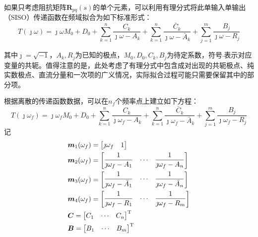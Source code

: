 如果只考虑阻抗矩阵$\boldsymbol{R}_{pq}(s)$的单个元素，可以利用有理分式将此单输入单输出（SISO）传递函数在频域拟合为如下标准形式\cite{Gustavsen:1999, Zeng:2006}：
\begin{equation}
	\label{eq:Standard-SISO-Freq}
	T(\jmath\omega)=\jmath\omega M_0+ D_0+ \sum_{k=1}^{n}\frac{C_k}{\jmath\omega-A_k}+ \sum_{k=1}^{n}\frac{\bar{C}_k}{\jmath\omega- \bar{A}_k}+ \sum_{j=1}^{m} \frac{B_j}{\jmath\omega -R_j}
\end{equation}

其中$\jmath=\sqrt{-1}$，$A_k, R_j$为已知的极点，$M_0, D_0, C_k, B_j$为待定系数，符号$\bar{}$表示对应变量的共轭。值得注意的是，此处考虑了有理分式中包含成对出现的共轭极点、纯实数极点、直流分量和一次项的广义情况，实际拟合过程可能只需要保留其中的部分项。

根据离散的传递函数数据，可以在$n_f$个频率点上建立如下方程：
\begin{equation}
	\label{eq:Discrete-Standard-Transfer}
	T(\jmath\omega_f)=\jmath\omega_f M_0+ D_0+ \sum_{k=1}^{n}\frac{C_k}{\jmath\omega_f-A_k}+ \sum_{k=1}^{n}\frac{\bar{C}_k}{\jmath\omega_f- \bar{A}_k}+ \sum_{j=1}^{m} \frac{B_j}{\jmath\omega_f -R_j}
\end{equation}
记
\begin{align}
	& \boldsymbol{m}_1(\omega_f)=\left[ \begin{matrix}
	   \jmath\omega_f & 1
	\end{matrix} \right] \nonumber\\
	& \boldsymbol{m}_2(\omega_f)=\left[ \begin{matrix}
	   \displaystyle{\frac{1}{\jmath \omega_f-A_1}} & \cdots & \displaystyle{\frac{1}{\jmath \omega_f-A_n}}  \\
	\end{matrix} \right] \nonumber\\ 
	& \boldsymbol{m}_3(\omega_f)=\left[ \begin{matrix}
	   \displaystyle{\frac{1}{\jmath \omega_f-\bar{A}_1}} & \cdots & \displaystyle{\frac{1}{\jmath \omega_f-\bar{A}_n}}  \\
	\end{matrix} \right]  \\ 
	& \boldsymbol{m}_4(\omega_f)=\left[ \begin{matrix}
	   \displaystyle{\frac{1}{\jmath \omega_f-R_1}} & \cdots & \displaystyle{\frac{1}{\jmath \omega_f-R_m}} \\ 
	\end{matrix} \right] \nonumber \\ 
	& \boldsymbol{C}=\left[ \begin{matrix}
	   C_1 & \cdots & C_n
	\end{matrix} \right]^{\mathrm{T}} \nonumber \\ 
	& \boldsymbol{B}=\left[ \begin{matrix}
	   B_1 & \cdots & B_m
	\end{matrix} \right]^{\mathrm{T}} \nonumber
\end{align}
